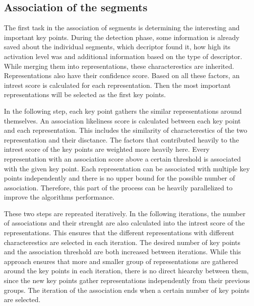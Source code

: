 \subsection{Association of the segments} %

The first task in the association of segments is determining the interesting and important key points. During the detection phase, some information is already saved about the individual segments, which decriptor found it, how high its activation level was and additional information based on the type of descriptor. While merging them into representations, these characterestics are inherited. Representations also have their confidence score. Based on all these factors, an intrest score is calculated for each representation. Then the most important representations will be selected as the first key points.

In the following step, each key point gathers the similar representations around themselves. An association likeliness score is calculated between each key point and each representation. This includes the similarity of characterestics of the two representation and their disctance. The factors that contributed heavily to the intrest score of the key points are weighted more heavily here. Every representation with an association score above a certain threshold is associated with the given key point. Each representation can be associated with multiple key points independently and there is no upper bound for the possible number of association. Therefore, this part of the process can be heavily parallelized to improve the algorithms performance.

These two steps are repreated iteratively. In the following iterations, the number of associations and their strenght are also calculated into the intrest score of the representations. This ensures that the different representations with different characterestics are selected in each iteration. The desired number of key points and the association threshold are both increased between iterations. While this approach ensures that more and smaller group of representations are gathered around the key points in each iteration, there is no direct hiearchy between them, since the new key points gather representations independently from their previous groups. The iteration of the association ends when a certain number of key points are selected.

